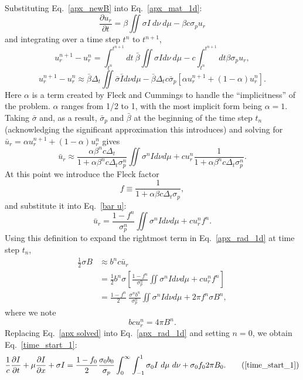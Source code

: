 Substituting Eq.\ \eqref{apx_newB} into Eq.\ \eqref{apx_mat_1d}: 
\begin{equation}
\frac{\partial u_r}{\partial t}=\beta\iint\sigma I\ d\nu\ d\mu -
\beta c\sigma_pu_r
\end{equation}
and integrating
over a time step $t^n$ to $t^{n+1}$,
\[u_r^{n+1}-u_r^n= \int_{t^n}^{t^{n+1}}dt\ \bar\beta\iint\sigma Id\nu\ d\mu -
  c\int_{t^n}^{t^{n+1}}dt\beta\sigma_pu_r,\]
\begin{equation}
u_r^{n+1}-u_r^n\approx\bar\beta\Delta_t\iint\bar\sigma\bar Id\nu d\mu -
  \bar\beta\Delta_tc\bar\sigma_p\left[\alpha u_r^{n+1}+(1-\alpha)u_r^n\right].
\end{equation}
Here $\alpha$ is a term created by Fleck and Cummings to handle the
``implicitness'' of the problem.  $\alpha$ ranges from 1/2 to 1, with the
most implicit form being $\alpha=1$.
  Taking $\bar\sigma$  and, as a result, $\bar\sigma_p$ and $\bar\beta$ at the
beginning of the time step $t_n$ (acknowledging the significant approximation
this introduces) and solving for $\bar u_r = \alpha u_r^{n+1} + (1-\alpha)u_r^n$
gives
\begin{equation}
\bar u_r \approx \frac{\alpha\beta^n c\Delta_t}{1+\alpha\beta^n
c\Delta_t\sigma_p^n}\iint\sigma^n Id\nu d\mu +  cu_r^n\frac{1}{1+\alpha\beta^n
c\Delta_t\sigma_p^n}.\label{bar u}
\end{equation}
At this point we introduce the Fleck factor
\begin{equation}
f\equiv\frac{1}{1+\alpha\beta c\Delta_t\sigma_p},
\end{equation}
and substitute it into Eq.\ \eqref{bar u}:
\begin{equation}
\bar u_r=\frac{1-f^n}{\sigma_p^n}\iint\sigma^n Id\nu d\mu+cu_r^nf^n.
\end{equation}
Using this definition to expand the rightmost term in Eq.\ \eqref{apx_rad_1d}
at time step $t_n$,
\begin{align}
\frac{1}{2}\sigma B &\approx b^nc\bar u_r \nonumber \\
      &=\frac{1}{2}b^n\sigma\left[\frac{1-f^n}{\sigma_p^n}
           \iint\sigma^n Id\nu d\mu + cu_r^nf^n\right]\nonumber \\
      &= \frac{1-f^n}{2}\ \frac{\sigma^n b^n}{\sigma_p^n}\iint\sigma^n Id\nu
           d\mu + 2\pi f^n\sigma B^n, \label{apx solved}
\end{align}
where we note
\[bcu_r^n = 4\pi B^n.\]
Replacing Eq.\ \eqref{apx solved} into Eq.\
\eqref{apx_rad_1d} and setting $n=0$, we obtain Eq.\
\eqref{time_start_1}:
\begin{equation}
\frac{1}{c}\frac{\partial I}{\partial t} + \mu\frac{\partial I}{\partial x}
+\sigma I =
  \frac{1-f_0}{2}\frac{\sigma_0b_0}{\sigma_p}\int_0^\infty\int_{-1}^1
  \sigma_0 I\ d\mu\ d\nu + \sigma_0 f_0 2\pi B_0.\tag{\ref{time_start_1}}
\end{equation}